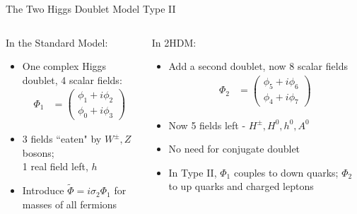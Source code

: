 \documentclass[10pt,xcolor={table,dvipsnames},t]{beamer}
\begin{document}
\begin{frame}{The Two Higgs Doublet Model Type II}
    \begin{columns}[t]
        \begin{column}{0.5\textwidth}
            In the Standard Model:
            \begin{itemize}
                \item One complex Higgs doublet, 4 scalar fields:
                    \begin{align*}
                        \Phi_1 &= \begin{pmatrix} \phi_1 + i\phi_2 \\ \phi_0+i\phi_3\end{pmatrix}
                    \end{align*}
                \item 3 fields ``eaten" by $W^\pm,Z$ bosons;\\ 1 real field left, $h$
                \item Introduce $\tilde{\Phi}=i\sigma_2\Phi_1$ for masses of all fermions
            \end{itemize}
        \end{column}
        \begin{column}{0.5\textwidth}
            In 2HDM:
            \begin{itemize}
                \item Add a second doublet, now 8 scalar fields
                    \begin{align*}
                        \Phi_2 &= \begin{pmatrix} \phi_5 + i\phi_6 \\ \phi_4 + i \phi_7\end{pmatrix}
                    \end{align*}
                \item Now 5 fields left - $H^\pm,H^0,h^0,A^0$
                \item No need for conjugate doublet
                \item In Type II, $\Phi_1$ couples to down quarks; $\Phi_2$ to up quarks and charged leptons
            \end{itemize}
        \end{column}
    \end{columns}
\end{frame}
\end{document}
